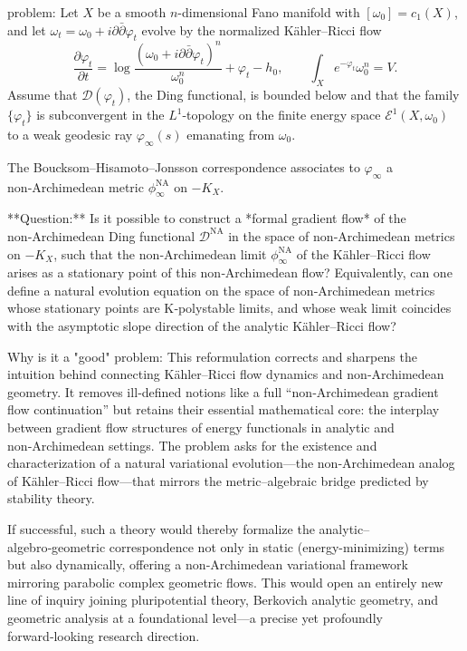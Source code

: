 problem:  
Let \( X \) be a smooth \(n\)-dimensional Fano manifold with \( [\omega_0] = c_1(X) \), and let \( \omega_t = \omega_0 + i\partial\bar{\partial}\varphi_t \) evolve by the normalized Kähler–Ricci flow  
\[
\frac{\partial \varphi_t}{\partial t} 
= \log\frac{(\omega_0 + i\partial\bar{\partial}\varphi_t)^n}{\omega_0^n}
+ \varphi_t - h_0,
\qquad \int_X e^{-\varphi_t} \omega_0^n = V.
\]
Assume that \( \mathcal{D}(\varphi_t) \), the Ding functional, is bounded below and that the family \(\{\varphi_t\}\) is subconvergent in the \(L^1\)-topology on the finite energy space \(\mathcal{E}^1(X,\omega_0)\) to a weak geodesic ray \(\varphi_\infty(s)\) emanating from \(\omega_0\).  

The Boucksom–Hisamoto–Jonsson correspondence associates to \(\varphi_\infty\) a non‑Archimedean metric \(\phi_\infty^{\mathrm{NA}}\) on \(-K_X\).  

**Question:**  
Is it possible to construct a *formal gradient flow* of the non‑Archimedean Ding functional \(\mathcal{D}^{\mathrm{NA}}\) in the space of non‑Archimedean metrics on \(-K_X\), such that the non‑Archimedean limit \(\phi_\infty^{\mathrm{NA}}\) of the Kähler–Ricci flow arises as a stationary point of this non‑Archimedean flow?  
Equivalently, can one define a natural evolution equation on the space of non‑Archimedean metrics whose stationary points are K‑polystable limits, and whose weak limit coincides with the asymptotic slope direction of the analytic Kähler–Ricci flow?

Why is it a "good" problem:  
This reformulation corrects and sharpens the intuition behind connecting Kähler–Ricci flow dynamics and non‑Archimedean geometry. It removes ill‑defined notions like a full “non‑Archimedean gradient flow continuation” but retains their essential mathematical core: the interplay between gradient flow structures of energy functionals in analytic and non‑Archimedean settings. The problem asks for the existence and characterization of a natural variational evolution—the non‑Archimedean analog of Kähler–Ricci flow—that mirrors the metric–algebraic bridge predicted by stability theory.

If successful, such a theory would thereby formalize the analytic–algebro‑geometric correspondence not only in static (energy-minimizing) terms but also dynamically, offering a non‑Archimedean variational framework mirroring parabolic complex geometric flows. This would open an entirely new line of inquiry joining pluripotential theory, Berkovich analytic geometry, and geometric analysis at a foundational level—a precise yet profoundly forward‑looking research direction.